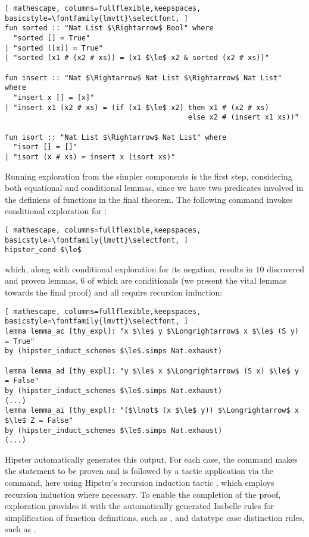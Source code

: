 \begin{lstlisting}[ mathescape, columns=fullflexible,keepspaces, basicstyle=\fontfamily{lmvtt}\selectfont, ]
fun sorted :: "Nat List $\Rightarrow$ Bool" where
  "sorted [] = True"
| "sorted ([x]) = True"
| "sorted (x1 # (x2 # xs)) = (x1 $\le$ x2 & sorted (x2 # xs))"

fun insert :: "Nat $\Rightarrow$ Nat List $\Rightarrow$ Nat List" where
  "insert x [] = [x]"
| "insert x1 (x2 # xs) = (if (x1 $\le$ x2) then x1 # (x2 # xs)	
                                           else x2 # (insert x1 xs))"

fun isort :: "Nat List $\Rightarrow$ Nat List" where
  "isort [] = []"
| "isort (x # xs) = insert x (isort xs)"
\end{lstlisting}

Running exploration from the simpler components is the first step, considering both equational and conditional lemmas, since we have two predicates involved in the definiens of functions in the final theorem.
%
The following command invokes conditional exploration for \isaCode{$\le$}:

\begin{lstlisting}[ mathescape, columns=fullflexible,keepspaces, basicstyle=\fontfamily{lmvtt}\selectfont, ]
hipster_cond $\le$
\end{lstlisting}

\noindent which, along with conditional exploration for its negation, results in $10$ discovered and proven lemmas, $6$ of which are conditionals (we present the vital lemmas towards the final proof) and all require recursion induction:

\begin{lstlisting}[ mathescape, columns=fullflexible,keepspaces, basicstyle=\fontfamily{lmvtt}\selectfont, ]
lemma lemma_ac [thy_expl]: "x $\le$ y $\Longrightarrow$ x $\le$ (S y) = True"
by (hipster_induct_schemes $\le$.simps Nat.exhaust)

lemma lemma_ad [thy_expl]: "y $\le$ x $\Longrightarrow$ (S x) $\le$ y = False"
by (hipster_induct_schemes $\le$.simps Nat.exhaust)
(...)
lemma lemma_ai [thy_expl]: "($\lnot$ (x $\le$ y)) $\Longrightarrow$ x $\le$ Z = False"
by (hipster_induct_schemes $\le$.simps Nat.exhaust)
(...)
\end{lstlisting}

\noindent Hipster automatically generates this output.
%
For each case, the  command makes the statement to be proven and is followed by a tactic application via the  command, here using Hipster's recursion induction tactic , which employs recursion induction where necessary.
%
To enable the completion of the proof, exploration provides it with the automatically generated Isabelle rules for simplification of function definitions, such as , and datatype case distinction rules, such as .

